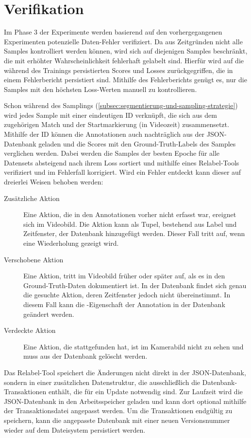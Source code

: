 \section{Verifikation}
\label{sec:nachgang}

Im Phase 3 der Experimente werden basierend auf den vorhergegangenen Experimenten potenzielle Daten-Fehler verifiziert.
Da aus Zeitgründen nicht alle Samples kontrolliert werden können, wird sich auf diejenigen Samples beschränkt, die mit erhöhter Wahrscheinlichkeit fehlerhaft gelabelt sind.
Hierfür wird auf die während des Trainings persistierten Scores und Losses zurückgegriffen, die in einem Fehlerbericht persistiert sind.
Mithilfe des Fehlerberichts genügt es, nur die Samples mit den höchsten Loss-Werten manuell zu kontrollieren.

Schon während des Samplings (\autoref{subsec:segmentierung-und-sampling-strategie}) wird jedes Sample mit einer eindeutigen ID verknüpft, die sich aus dem zugehörigen Match und der Startmarkierung (in Videozeit) zusammensetzt.
Mithilfe der ID können die Annotationen auch nachträglich aus der JSON-Datenbank geladen und die Scores mit den Ground-Truth-Labels des Samples verglichen werden.
Dabei werden die Samples der besten Epoche für alle Datensets absteigend nach ihrem Loss sortiert und mithilfe eines Relabel-Tools verifiziert und im Fehlerfall \ggf korrigiert.
Wird ein Fehler entdeckt kann dieser auf dreierlei Weisen behoben werden:

\begin{description}
    \item[Zusätzliche Aktion] Eine Aktion, die in den Annotationen vorher nicht erfasst war, ereignet sich im Videobild.
    Die Aktion kann als Tupel, bestehend aus Label und Zeitfenster, der Datenbank hinzugefügt werden.
    Dieser Fall tritt \zB auf, wenn eine Wiederholung gezeigt wird.
    \item[Verschobene Aktion] Eine Aktion, tritt im Videobild früher oder später auf, als es in den Ground-Truth-Daten dokumentiert ist.
    In der Datenbank findet sich genau die gesuchte Aktion, deren Zeitfenster jedoch nicht übereinstimmt.
    In diesem Fall kann die -Eigenschaft der Annotation in der Datenbank geändert werden.
    \item[Verdeckte Aktion] Eine Aktion, die stattgefunden hat, ist im Kamerabild nicht zu sehen und muss aus der Datenbank gelöscht werden.
\end{description}

Das Relabel-Tool speichert die Änderungen nicht direkt in der JSON-Datenbank, sondern in einer zusätzlichen Datenstruktur, die ausschließlich die Datenbank-Transaktionen enthält, die für ein Update notwendig sind.
Zur Laufzeit wird die JSON-Datenbank in den Arbeitsspeicher geladen und kann dort optional mithilfe der Transaktionsdatei angepasst werden.
Um die Transaktionen endgültig zu speichern, kann die angepasste Datenbank mit einer neuen Versionsnummer wieder auf dem Dateisystem persistiert werden.

